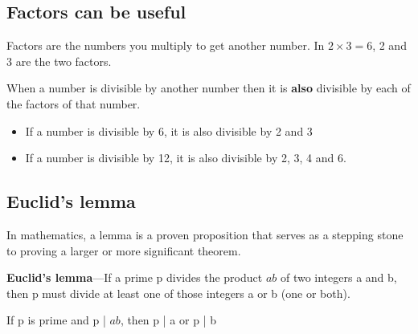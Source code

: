 \subsection{Factors can be useful}

Factors are the numbers you multiply to get another number. In $2 \times 3=6$, 2 and 3 are the two factors.

When a number is divisible by another number then it is \textbf{also} divisible by each of the factors of that number.

\begin{itemize}
  \item If a number is divisible by 6, it is also divisible by 2 and 3
  \item If a number is divisible by 12, it is also divisible by 2, 3, 4 and 6.
\end{itemize}

\subsection{Euclid's lemma}

In mathematics, a lemma is a proven proposition that serves as a stepping stone to proving a larger or more significant theorem.

\textbf{Euclid's lemma}—If a prime p divides the product $ab$ of two integers a and b, then p must divide at least one of those integers a or b (one or both).

If p is prime and p | $ab$, then p | a or p | b
